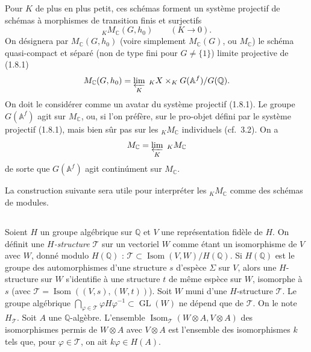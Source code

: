 \documentclass[11pt]{amsart}
\theoremstyle{plain}
\theoremstyle{definition}
\DeclareMathOperator{\Isom}{Isom}
\DeclareMathOperator{\GL}{GL}
\newcommand{\QQ}{\mathbb{Q}}
\newcommand{\AAf}{\mathbb{A}^f}
\newcommand{\MC}{M_{\mathbb{C}}}
\begin{document}
Pour $K$ de plus en plus petit, ces sch\'emas forment un syst\`eme projectif de sch\'emas \`a morphismes de transition finis et surjectifs
\begin{equation}\label{eq:1.8.1}
{}_K \MC(G,h_0) \qquad (K \to 0).
\end{equation}
On d\'esignera par $\MC(G,h_0)$ (voire simplement $\MC(G)$, ou $\MC$) le sch\'ema quasi-compact et s\'epar\'e (non de type fini pour $G \neq \{1\}$) limite projective de (1.8.1)
\begin{equation}\label{eq:1.8.2}
\MC(G,h_0) = \varprojlim_K \; {}_K X \times_K G(\AAf)/G(\QQ).
\end{equation}
On doit le consid\'erer comme un avatar du syst\`eme projectif (1.8.1). Le groupe $G(\AAf)$ agit sur $\MC$, ou, si l'on pr\'ef\`ere, sur le pro-objet d\'efini par le syst\`eme projectif (1.8.1), mais bien s\^ur pas sur les ${}_K \MC$ individuels (cf.\ 3.2). On a
\begin{equation}\label{eq:1.8.3}
\MC = \varprojlim_K \; {}_K \MC
\end{equation}
de sorte que $G(\AAf)$ agit contin\'ument sur $\MC$.

La construction suivante sera utile pour interpr\'eter les ${}_K \MC$ comme des sch\'emas de modules.

\subsection{}

Soient $H$ un groupe alg\'ebrique sur $\QQ$ et $V$ une repr\'esentation fid\`ele de $H$. On d\'efinit une \emph{$H$-structure} $\mathcal{T}$ sur un vectoriel $W$ comme \'etant un isomorphisme de $V$ avec $W$, donn\'e modulo $H(\QQ)$ : $\mathcal{T} \subset \Isom(V,W)/H(\QQ)$. Si $H(\QQ)$ est le groupe des automorphismes d'une structure $s$ d'esp\`ece $\Sigma$ sur $V$, alors une $H$-structure sur $W$ s'identifie \`a une structure $t$ de m\^eme esp\`ece sur $W$, isomorphe \`a $s$ (avec $\mathcal{T} = \Isom((V,s),(W,t))$). Soit $W$ muni d'une $H$-structure $\mathcal{T}$. Le groupe alg\'ebrique $\bigcap_{\varphi \in \mathcal{T}} \varphi H \varphi^{-1} \subset \GL(W)$ ne d\'epend que de $\mathcal{T}$. On le note $H_{\mathcal{T}}$. Soit $A$ une $\QQ$-alg\`ebre. L'ensemble $\Isom_{\mathcal{T}}(W \otimes A, V \otimes A)$ des isomorphismes permis de $W \otimes A$ avec $V \otimes A$ est l'ensemble des isomorphismes $k$ tels que, pour $\varphi \in \mathcal{T}$, on ait $k \varphi \in H(A)$.

\subsection{}
\end{document}
